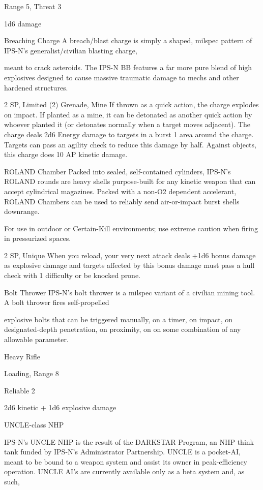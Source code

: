 Range 5, Threat 3
 
1d6 damage
 

Breaching Charge  
A breach/blast charge is simply a shaped, milspec pattern of IPS-N’s generalist/civilian blasting charge,  

meant to crack asteroids. The IPS-N BB features a far more pure blend of high explosives designed to  
cause massive traumatic damage to mechs and other hardened structures.   

2 SP, Limited (2)  
Grenade, Mine  
If thrown as a quick action, the charge explodes on impact. If planted as a mine, it can be  
detonated as another quick action by whoever planted it (or detonates normally when a target  
moves adjacent). The charge deals 2d6 Energy damage to targets in a burst 1 area around the  
charge. Targets can pass an agility check to reduce this damage by half. Against objects, this  
charge does 10 AP kinetic damage.  

ROLAND Chamber  
Packed into sealed, self-contained cylinders, IPS-N’s ROLAND rounds are heavy shells purpose-built for  
any kinetic weapon that can accept cylindrical magazines. Packed with a non-O2 dependent accelerant,  
ROLAND Chambers can be used to reliably send air-or-impact burst shells downrange.   

For use in outdoor or Certain-Kill environments; use extreme caution when firing in pressurized spaces.  

2 SP, Unique  
When you reload, your very next attack deals +1d6 bonus damage as explosive damage and  
targets affected by this bonus damage must pass a hull check with 1 difficulty or be knocked  
prone.
 

Bolt Thrower  
IPS-N’s bolt thrower is a milspec variant of a civilian mining tool. A bolt thrower fires self-propelled  

explosive bolts that can be triggered manually, on a timer, on impact, on designated-depth penetration, on  
proximity, on on some combination of any allowable parameter.   

Heavy Rifle
 
Loading, Range 8
 
Reliable 2
 
2d6 kinetic + 1d6 explosive damage
 

UNCLE-class NHP  

                                                                                                                  


IPS-N’s UNCLE NHP is the result of the DARKSTAR Program, an NHP think tank funded by IPS-N’s  
Administrator Partnership. UNCLE is a pocket-AI, meant to be bound to a weapon system and assist its  
owner in peak-efficiency operation. UNCLE AI’s are currently available only as a beta system and, as such,  

